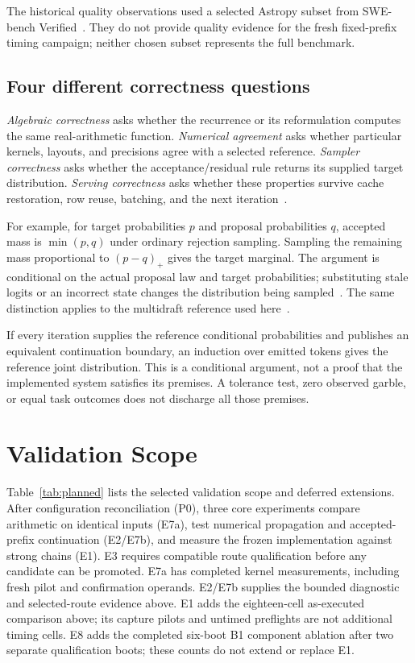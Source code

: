 \documentclass[conference]{IEEEtran}
\begin{document}
The historical quality observations used a selected Astropy subset from SWE-bench Verified~\cite{jimenez2024swe}. They do not provide quality evidence for the fresh fixed-prefix timing campaign; neither chosen subset represents the full benchmark.

\subsection{Four different correctness questions}
\textit{Algebraic correctness} asks whether the recurrence or its reformulation computes the same real-arithmetic function. \textit{Numerical agreement} asks whether particular kernels, layouts, and precisions agree with a selected reference. \textit{Sampler correctness} asks whether the acceptance/residual rule returns its supplied target distribution. \textit{Serving correctness} asks whether these properties survive cache restoration, row reuse, batching, and the next iteration~\cite{yang2024delta,chen2023sampling,lumo2026archive}.

For example, for target probabilities $p$ and proposal probabilities $q$, accepted mass is $\min(p,q)$ under ordinary rejection sampling. Sampling the remaining mass proportional to $(p-q)_+$ gives the target marginal. The argument is conditional on the actual proposal law and target probabilities; substituting stale logits or an incorrect state changes the distribution being sampled~\cite{leviathan2023fast,chen2023sampling}. The same distinction applies to the multidraft reference used here~\cite{miao2023specinfer,lumo2026archive}.

If every iteration supplies the reference conditional probabilities and publishes an equivalent continuation boundary, an induction over emitted tokens gives the reference joint distribution. This is a conditional argument, not a proof that the implemented system satisfies its premises. A tolerance test, zero observed garble, or equal task outcomes does not discharge all those premises.


\section{Validation Scope}
\label{app:validation}
Table~\ref{tab:planned} lists the selected validation scope and deferred extensions. After configuration reconciliation (P0), three core experiments compare arithmetic on identical inputs (E7a), test numerical propagation and accepted-prefix continuation (E2/E7b), and measure the frozen implementation against strong chains (E1). E3 requires compatible route qualification before any candidate can be promoted. E7a has completed kernel measurements, including fresh pilot and confirmation operands. E2/E7b supplies the bounded diagnostic and selected-route evidence above. E1 adds the eighteen-cell as-executed comparison above; its capture pilots and untimed preflights are not additional timing cells. E8 adds the completed six-boot B1 component ablation after two separate qualification boots; these counts do not extend or replace E1.
\end{document}
